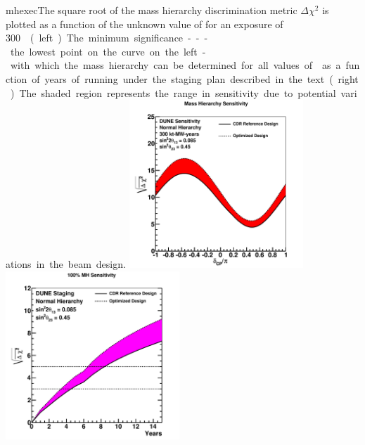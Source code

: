 \begin{cdrfigure}{mhexec}{The
    square root of the mass hierarchy discrimination metric $\Delta
    \chi^2$ is plotted as a function of the unknown value of \deltacp
    for an exposure of \SI{300}\ktMWyr{} %
    (left).  The minimum significance
    --- the lowest point on the curve on the left - with which the mass
    hierarchy can be determined for all values of \deltacp as a
    function of years of running under the staging plan described in the text (right).
    The shaded region represents the range in sensitivity due to
    potential variations in the beam design.}
\includegraphics[width=0.49\textwidth]{volume-physics/figures/mh_300ktmwyear}
\includegraphics[width=0.49\textwidth]{volume-physics/figures/mh_exp_staging15yr}
\label{fig:mhexec}
\end{cdrfigure}

